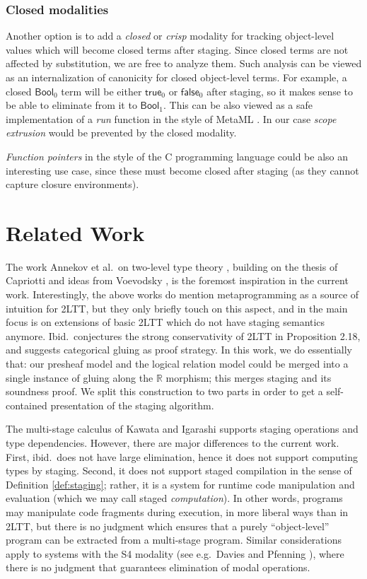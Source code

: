 \documentclass[acmsmall,review]{acmart}
\newcommand{\msf}[1]{\mathsf{#1}}
\newcommand{\mbb}[1]{\mathbb{#1}}
\newcommand{\Bool}{\msf{Bool}}
\newcommand{\true}{\msf{true}}
\newcommand{\false}{\msf{false}}
\newcommand{\re}{\mbb{R}}
\theoremstyle{remark}
\begin{document}
\subsubsection{Closed modalities}\label{sec:closed-modalities}
Another option is to add a \emph{closed} or \emph{crisp} modality
\cite{licata2018internal} for tracking object-level values which will become
closed terms after staging. Since closed terms are not affected by substitution,
we are free to analyze them. Such analysis can be viewed as an internalization
of canonicity for closed object-level terms. For example, a closed $\Bool_0$
term will be either $\true_0$ or $\false_0$ after staging, so it makes sense to
be able to eliminate from it to $\Bool_1$. This can be also viewed as a safe
implementation of a \emph{run} function in the style of MetaML \cite{metaml}.
In our case \emph{scope extrusion} would be prevented by the closed modality.

\emph{Function pointers} in the style of the C programming language could be also
an interesting use case, since these must become closed after staging (as they
cannot capture closure environments).

\section{Related Work}\label{sec:related-work}

The work Annekov et al.\ on two-level type theory \cite{twolevel}, building on
the thesis of Capriotti \cite{capriotti2017models} and ideas from Voevodsky
\cite{hts}, is the foremost inspiration in the current work. Interestingly, the
above works do mention metaprogramming as a source of intuition for 2LTT, but
they only briefly touch on this aspect, and in \cite{twolevel} the main focus is
on extensions of basic 2LTT which do not have staging semantics
anymore. Ibid.\ conjectures the strong conservativity of 2LTT in Proposition
2.18, and suggests categorical gluing as proof strategy. In this work, we do
essentially that: our presheaf model and the logical relation model could be
merged into a single instance of gluing along the $\re$ morphism; this merges
staging and its soundness proof. We split this construction to two parts in order
to get a self-contained presentation of the staging algorithm.

The multi-stage calculus of Kawata and Igarashi \cite{multi-stage-calculus}
supports staging operations and type dependencies. However, there are major
differences to the current work. First, ibid.\ does not have large elimination,
hence it does not support computing types by staging. Second, it does not
support staged compilation in the sense of Definition \ref{def:staging}; rather,
it is a system for runtime code manipulation and evaluation (which we may call
staged \emph{computation}). In other words, programs may manipulate code
fragments during execution, in more liberal ways than in 2LTT, but there is no
judgment which ensures that a purely ``object-level'' program can be extracted
from a multi-stage program. Similar considerations apply to systems with the S4
modality (see e.g.\ Davies and Pfenning \cite{DBLP:journals/jacm/DaviesP01}),
where there is no judgment that guarantees elimination of modal operations.
\end{document}

